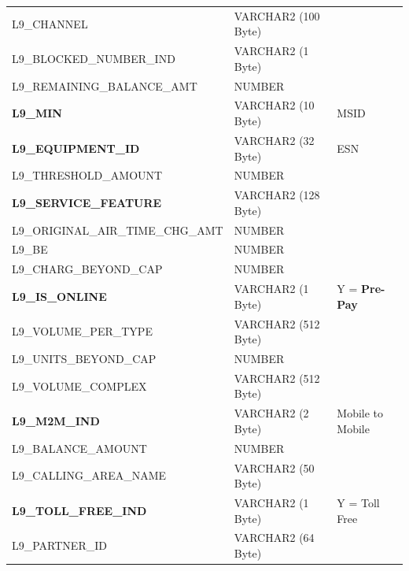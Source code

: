 \documentclass[12pt,twoside]{article}
\begin{document}
\begin{longtable}{lll}
 L9\_CHANNEL                             &  VARCHAR2 (100 Byte)  &                            \\
 L9\_BLOCKED\_NUMBER\_IND                &  VARCHAR2 (1 Byte)    &                            \\
 L9\_REMAINING\_BALANCE\_AMT             &  NUMBER               &                            \\
 \textbf{L9\_MIN}                        &  VARCHAR2 (10 Byte)   &  MSID                      \\
 \textbf{L9\_EQUIPMENT\_ID}              &  VARCHAR2 (32 Byte)   &  ESN                       \\
 L9\_THRESHOLD\_AMOUNT                   &  NUMBER               &                            \\
 \textbf{L9\_SERVICE\_FEATURE}           &  VARCHAR2 (128 Byte)  &                            \\
 L9\_ORIGINAL\_AIR\_TIME\_CHG\_AMT       &  NUMBER               &                            \\
 L9\_BE                                  &  NUMBER               &                            \\
 L9\_CHARG\_BEYOND\_CAP                  &  NUMBER               &                            \\
 \textbf{L9\_IS\_ONLINE}                 &  VARCHAR2 (1 Byte)    &  Y = \textbf{Pre-Pay}      \\
 L9\_VOLUME\_PER\_TYPE                   &  VARCHAR2 (512 Byte)  &                            \\
 L9\_UNITS\_BEYOND\_CAP                  &  NUMBER               &                            \\
 L9\_VOLUME\_COMPLEX                     &  VARCHAR2 (512 Byte)  &                            \\
 \textbf{L9\_M2M\_IND}                   &  VARCHAR2 (2 Byte)    &  Mobile to Mobile          \\
 L9\_BALANCE\_AMOUNT                     &  NUMBER               &                            \\
 L9\_CALLING\_AREA\_NAME                 &  VARCHAR2 (50 Byte)   &                            \\
 \textbf{L9\_TOLL\_FREE\_IND}            &  VARCHAR2 (1 Byte)    &  Y = Toll Free             \\
 L9\_PARTNER\_ID                         &  VARCHAR2 (64 Byte)   &                            \\

\end{longtable}
\end{document}
